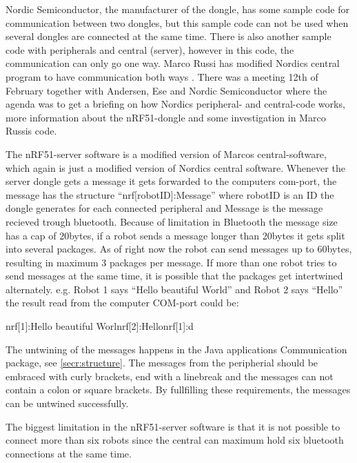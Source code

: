 Nordic Semiconductor, the manufacturer of the dongle, has some sample code for communication between two dongles, but this sample code can not be used when several dongles are connected at the same time. There is also another sample code with peripherals and central (server), however in this code, the communication can only go one way. Marco Russi has modified Nordics central program to have communication both ways \cite{marcoRussi}. There was a meeting 12th of February together with Andersen, Ese and Nordic Semiconductor where the agenda was to get a briefing on how Nordics peripheral- and central-code works, more information about the nRF51-dongle and some investigation in Marco Russis code.

The nRF51-server software is a modified version of Marcos central-software, which again is just a modified version of Nordics central software. Whenever the server dongle gets a message it gets forwarded to the computers \acrshort{com}-port, the message has the structure ``nrf[robotID]:Message'' where robotID is an ID the dongle generates for each connected peripheral and Message is the message recieved trough bluetooth. Because of limitation in Bluetooth the message size has a cap of 20bytes, if a robot sends a message longer than 20bytes it gets split into several packages. As of right now the robot can send messages up to 60bytes, resulting in maximum 3 packages per message. If more than one robot tries to send messages at the same time, it is possible that the packages get intertwined alternately. e.g. Robot 1 says ``Hello beautiful World'' and Robot 2 says ``Hello'' the result read from the computer COM-port could be: 

nrf[1]:Hello beautiful Worlnrf[2]:Hellonrf[1]:d

The untwining of the messages happens in the Java applications Communication package, see \ref{secr:structure}. The messages from the peripherial should be embraced with curly brackets, end with a linebreak and the messages can not contain a colon or square brackets. By fullfilling these requirements, the messages can be untwined successfully.

The biggest limitation in the nRF51-server software is that it is not possible to connect more than six robots since the central can maximum hold six bluetooth connections at the same time.

